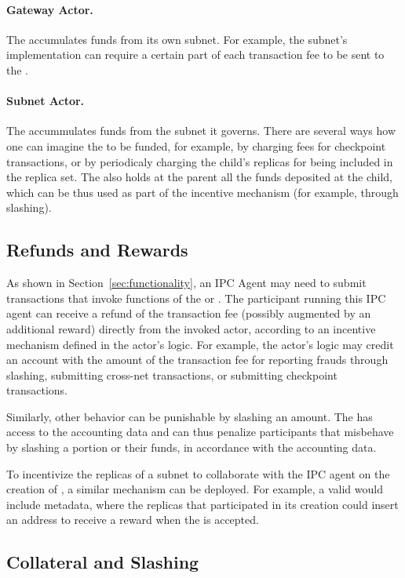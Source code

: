 \paragraph{Gateway Actor.}
The \gw accumulates funds from its own subnet. For example, the subnet's implementation can require a certain part of each transaction fee to be sent to the \gw.

\paragraph{Subnet Actor.}
The \sa accummulates funds from the subnet it governs.
There are several ways how one can imagine the \sa to be funded,
for example, by charging fees for checkpoint transactions,
or by periodicaly charging the child's replicas for being included in the replica set. The \sa also holds at the parent all the funds deposited at the child, which can be thus used as part of the incentive mechanism (for example, through slashing).

\subsection{Refunds and Rewards}
\label{sec:refunds-rewards}

As shown in Section~\ref{sec:functionality}, an IPC Agent may need to submit transactions that invoke functions of the \gw or \sa. The participant running this IPC agent can receive a refund of the transaction fee (possibly augmented by an additional reward) directly from the invoked actor, according to an incentive mechanism defined in the actor's logic. For example, the actor's logic may credit an account with the amount of the transaction fee for reporting frauds through slashing, submitting cross-net transactions, or submitting checkpoint transactions. 

Similarly, other behavior can be punishable by slashing an amount. The \sa has access to the accounting data and can thus penalize participants that misbehave by slashing a portion or their funds, in accordance with the accounting data. 

To incentivize the replicas of a subnet to collaborate with the IPC agent on the creation of \pofsFull, a similar mechanism can be deployed.
For example, a valid \pof would include metadata, where the replicas that participated in its creation could insert an address to receive a reward when the \pof is accepted.

\subsection{Collateral and Slashing}
\label{sec:incentives-collateral-slashing}

